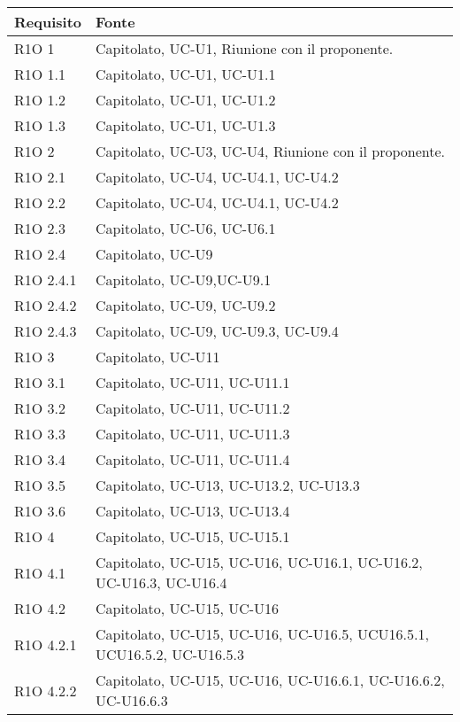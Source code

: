 \begin{center}
  \bgroup
  \def\arraystretch{1.8}
  \begin{longtable}{ | l | p{8cm} | }
    \hline
    \cellcolor[gray]{0.9} \textbf{Requisito} &   
    \cellcolor[gray]{0.9} \textbf{Fonte}\\ \hline
    R1O 1 & Capitolato, UC-U1, Riunione con il proponente. \\ \hline
    R1O 1.1 & Capitolato, UC-U1, UC-U1.1 \\ \hline
    R1O 1.2 & Capitolato, UC-U1, UC-U1.2 \\ \hline
    R1O 1.3 & Capitolato, UC-U1, UC-U1.3 \\ \hline
    R1O 2 & Capitolato, UC-U3, UC-U4, Riunione con il proponente. \\ \hline
    R1O 2.1 & Capitolato, UC-U4, UC-U4.1, UC-U4.2 \\ \hline
    R1O 2.2 & Capitolato, UC-U4, UC-U4.1, UC-U4.2\\ \hline
    R1O 2.3 & Capitolato, UC-U6, UC-U6.1 \\ \hline
    R1O 2.4 & Capitolato, UC-U9 \\ \hline
    R1O 2.4.1 & Capitolato, UC-U9,UC-U9.1 \\ \hline
    R1O 2.4.2 & Capitolato, UC-U9, UC-U9.2 \\ \hline
    R1O 2.4.3 & Capitolato, UC-U9, UC-U9.3, UC-U9.4\\ \hline
    R1O 3 & Capitolato, UC-U11 \\ \hline
    R1O 3.1 & Capitolato, UC-U11, UC-U11.1\\ \hline
    R1O 3.2 & Capitolato, UC-U11, UC-U11.2\\ \hline
    R1O 3.3 & Capitolato, UC-U11, UC-U11.3\\ \hline
    R1O 3.4 & Capitolato, UC-U11, UC-U11.4\\ \hline
    R1O 3.5 & Capitolato, UC-U13, UC-U13.2, UC-U13.3\\ \hline
    R1O 3.6 & Capitolato, UC-U13, UC-U13.4\\ \hline
    R1O 4 & Capitolato, UC-U15, UC-U15.1 \\ \hline
    R1O 4.1 & Capitolato, UC-U15, UC-U16, UC-U16.1, UC-U16.2, UC-U16.3, UC-U16.4 \\ \hline
    R1O 4.2 & Capitolato, UC-U15, UC-U16 \\ \hline
    R1O 4.2.1 & Capitolato, UC-U15, UC-U16, UC-U16.5, UCU16.5.1, UCU16.5.2, UC-U16.5.3 \\ \hline
    R1O 4.2.2 & Capitolato, UC-U15, UC-U16, UC-U16.6.1, UC-U16.6.2, UC-U16.6.3 \\ \hline

\end{longtable}
\end{center}
